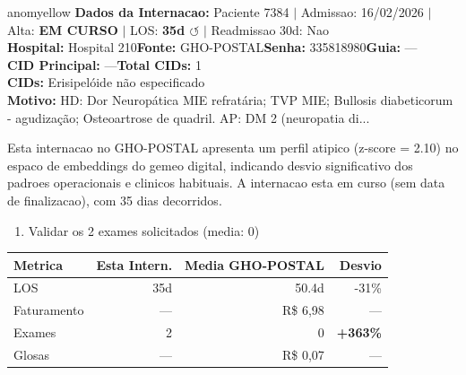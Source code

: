 \documentclass[a4paper,10pt]{article}
\begin{document}
\begin{anomalycard}[Internacao 10983 | GHO-POSTAL | MODERADO (z=2.10)]{anomyellow}
\textbf{Dados da Internacao:} Paciente 7384 $\mid$ Admissao: 16/02/2026 $\mid$ Alta: \textcolor{anomorange}{\textbf{EM CURSO}} $\mid$ LOS: \textbf{35d \textcolor{anomorange}{$\circlearrowleft$}} $\mid$ Readmissao 30d: Nao\\
\textbf{Hospital:} Hospital 210\quad\textbf{Fonte:} GHO-POSTAL\quad\textbf{Senha:} 335818980\quad\textbf{Guia:} ---\\
\textbf{CID Principal:} {\small ---}\quad\textbf{Total CIDs:} 1\\

\textbf{CIDs:} {\scriptsize Erisipelóide não especificado}\\

\textbf{Motivo:} {\scriptsize HD: Dor Neuropática MIE refratária; TVP MIE; Bullosis diabeticorum - agudização; Osteoartrose de quadril. AP: DM 2 (neuropatia di...}\\

\vspace{2pt}\begin{tcolorbox}[colback=severityred!20,colframe=anomyellow,title={\textbf{Interpretacao de Negocio}},fonttitle=\bfseries\small,left=4pt,right=4pt,top=3pt,bottom=3pt]
{\small Esta internacao no GHO-POSTAL apresenta um perfil atipico (z-score = 2.10) no espaco de embeddings do gemeo digital, indicando desvio significativo dos padroes operacionais e clinicos habituais. A internacao esta em curso (sem data de finalizacao), com 35 dias decorridos.}
\end{tcolorbox}
\begin{tcolorbox}[colback=severityyellow!30,colframe=anomorange,title={\textbf{Recomendacoes Especificas}},fonttitle=\bfseries\small,left=4pt,right=4pt,top=3pt,bottom=3pt]
\begin{enumerate}[nosep,leftmargin=16pt]
\item {\small Validar os 2 exames solicitados (media: 0)}
\end{enumerate}
\end{tcolorbox}
\begin{center}\begin{tabular}{l r r r}\toprule\textbf{Metrica} & \textbf{Esta Intern.} & \textbf{Media GHO-POSTAL} & \textbf{Desvio} \\\midrule
LOS & 35d & 50.4d & -31\% \\
Faturamento & --- & R\$ 6,98 & --- \\
Exames & 2 & 0 & \textcolor{anomred}{\textbf{+363\%}} \\
Glosas & --- & R\$ 0,07 & --- \\
\bottomrule\end{tabular}\end{center}


\end{anomalycard}
\end{document}

